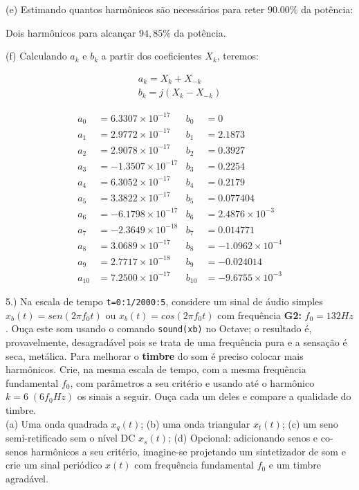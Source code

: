 \documentclass{article}
\begin{document}
\vspace{\baselineskip}

(e) Estimando quantos harmônicos são necessários para reter $90.00\%$ da potência:

\vspace{\baselineskip}

Dois harmônicos para alcançar $94,85\% $ da potência.

\vspace{\baselineskip}

(f) Calculando $a_{k}$ e $b_{k}$ a partir dos coeficientes $X_{k}$, teremos:

\begin{align*}
    a_{k} = X_{k} + X_{-k}\\
    b_{k} = j(X_{k} - X_{-k})
\end{align*}

\begin{align*}
    a_{0} &= 6.3307\times 10^{-17}   &   b_{0} &= 0\\
    a_{1} &= 2.9772\times 10^{-17}   &   b_{1} &= 2.1873\\
    a_{2} &= 2.9078\times 10^{-17}   &   b_{2} &= 0.3927\\
    a_{3} &= -1.3507\times 10^{-17}  &   b_{3} &= 0.2254\\
    a_{4} &= 6.3052\times 10^{-17}   &   b_{4} &= 0.2179\\
    a_{5} &= 3.3822\times 10^{-17}   &   b_{5} &= 0.077404\\
    a_{6} &= -6.1798\times 10^{-17}  &   b_{6} &= 2.4876\times 10^{-3}\\
    a_{7} &= -2.3649\times 10^{-18}  &   b_{7} &= 0.014771\\
    a_{8} &= 3.0689\times 10^{-17}   &   b_{8} &= -1.0962\times 10^{-4}\\
    a_{9} &= 2.7717\times 10^{-18}   &   b_{9} &= -0.024014\\
    a_{10} &= 7.2500\times 10^{-17}  &   b_{10} &= -9.6755\times 10^{-3}
\end{align*}

5.) Na escala de tempo {\tt t=0:1/2000:5}, considere um sinal de áudio simples $x_{b}(t) = sen(2 \pi f_{0}t)$ ou $x_{b}(t) = cos(2 \pi f_{0}t)$ com frequência \textbf{G2:} $f_{0} = 132Hz$. Ouça este som usando o comando {\tt sound(xb)} no Octave; o resultado é, provavelmente, desagradável pois se trata de uma frequência pura e a sensação é seca, metálica. Para melhorar o \textbf{timbre} do som é preciso colocar mais harmônicos. Crie, na mesma escala de tempo, com a mesma frequência fundamental $f_{0}$, com parâmetros a seu critério e usando até o harmônico $k = 6\;(6f_{0}Hz)$ os sinais a seguir. Ouça cada um deles e compare a qualidade do timbre.\\
(a) Uma onda quadrada $x_{q}(t)$;
(b) uma onda triangular $x_{t}(t)$;
(c) um seno semi-retificado sem o nível DC $x_{s}(t)$;
(d) Opcional: adicionando senos e co-senos harmônicos a seu critério, imagine-se projetando um sintetizador de som e crie um sinal periódico $x(t)$ com frequência fundamental $f_{0}$ e um timbre agradável.
\end{document}
